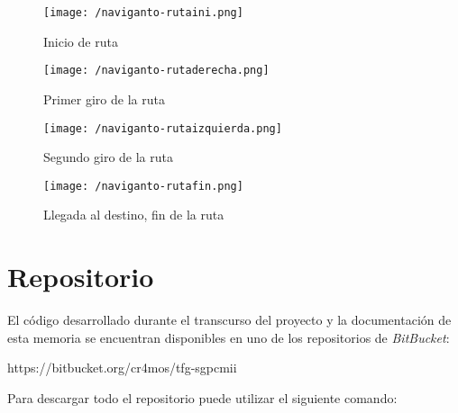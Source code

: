 \begin{figure}[!h]
  \begin{minipage}[b]{0.5\linewidth}
    \begin{center}
      \texttt{[image: /naviganto-rutaini.png]}
      \caption{Inicio de ruta}
      \label{fig:navigantoRutaIni}
    \end{center}
  \end{minipage}
  \begin{minipage}[b]{0.5\linewidth}
    \begin{center}
      \texttt{[image: /naviganto-rutaderecha.png]}
      \caption{Primer giro de la ruta}
      \label{fig:navigantoRutaPrimerGiro}
    \end{center}
  \end{minipage}
\end{figure}

\begin{figure}[!h]
  \begin{minipage}[b]{0.5\linewidth}
    \begin{center}
      \texttt{[image: /naviganto-rutaizquierda.png]}
      \caption{Segundo giro de la ruta}
      \label{fig:navigantoRutaSegundoGiro}
    \end{center}
  \end{minipage}
  \begin{minipage}[b]{0.5\linewidth}
    \begin{center}
      \texttt{[image: /naviganto-rutafin.png]}
      \caption{Llegada al destino, fin de la ruta}
      \label{fig:navigantoRutaFin}
    \end{center}
  \end{minipage}
\end{figure}

\section{Repositorio}

El código desarrollado durante el transcurso del proyecto y la documentación de esta memoria se
encuentran disponibles en uno de los repositorios de \emph{BitBucket}:

\begin{listing}
https://bitbucket.org/cr4mos/tfg-sgpcmii
\end{listing}

Para descargar todo el repositorio puede utilizar el siguiente comando:


